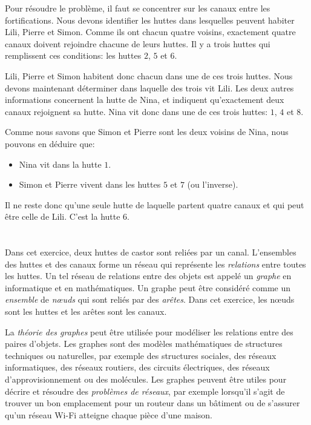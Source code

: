 {{Pour résoudre le problème, il faut se concentrer sur les canaux entre les fortifications. Nous devons identifier les huttes dans lesquelles peuvent habiter Lili, Pierre et Simon. Comme ils ont chacun quatre voisins, exactement quatre canaux doivent rejoindre chacune de leurs huttes. Il y a trois huttes qui remplissent ces conditions: les huttes $2$, $5$ et $6$.

{\centering%
\par}

Lili, Pierre et Simon habitent donc chacun dans une de ces trois huttes. Nous devons maintenant déterminer dans laquelle des trois vit Lili.
Les deux autres informations concernent la hutte de Nina, et indiquent qu’exactement deux canaux rejoignent sa hutte. Nina vit donc dans une de ces trois huttes: $1$, $4$ et $8$.

{\centering%
\par}

Comme nous savons que Simon et Pierre sont les deux voisins de Nina, nous pouvons en déduire que:

\begin{itemize}
  \item Nina vit dans la hutte $1$.
  \item Simon et Pierre vivent dans les huttes $5$ et $7$ (ou l’inverse).
\end{itemize}

Il ne reste donc qu’une seule hutte de laquelle partent quatre canaux et qui peut être celle de Lili. C’est la hutte $6$.



\section*{\BrochureItsInformatics}
Dans cet exercice, deux huttes de castor sont reliées par un canal. L’ensembles des huttes et des canaux forme un réseau qui représente les \emph{relations} entre toutes les huttes. Un tel réseau de relations entre des objets est appelé un \emph{graphe} en informatique et en mathématiques. Un graphe peut être considéré comme un \emph{ensemble} de \emph{nœuds} qui sont reliés par des \emph{arêtes}. Dans cet exercice, les nœuds sont les huttes et les arêtes sont les canaux.

La \emph{théorie des graphes} peut être utilisée pour modéliser les relations entre des paires d’objets. Les graphes sont des modèles mathématiques de structures techniques ou naturelles, par exemple des structures sociales, des réseaux informatiques, des réseaux routiers, des circuits électriques, des réseaux d’approvisionnement ou des molécules. Les graphes peuvent être utiles pour décrire et résoudre des \emph{problèmes de réseaux}, par exemple lorsqu’il s’agit de trouver un bon emplacement pour un routeur dans un bâtiment ou de s’assurer qu’un réseau Wi-Fi atteigne chaque pièce d’une maison.

}}
